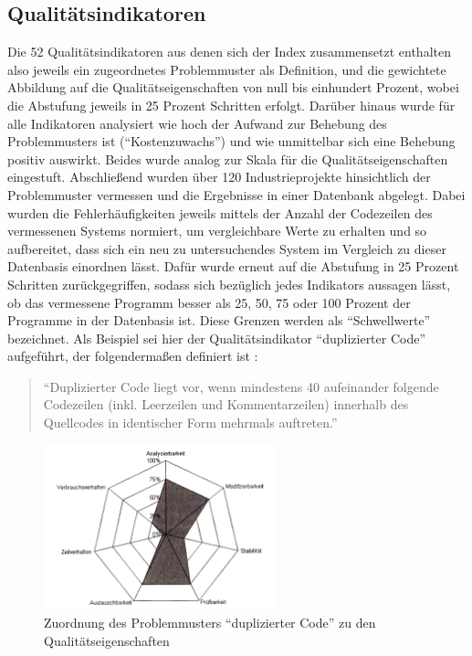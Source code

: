 \documentclass[da,ngerman]{stthesis}
\begin{document}
			\subsection{Qualitätsindikatoren}
				Die 52 Qualitätsindikatoren aus denen sich der Index zusammensetzt enthalten also jeweils ein zugeordnetes Problemmuster als Definition, und die gewichtete Abbildung auf die Qualitätseigenschaften von null bis einhundert Prozent, wobei die Abstufung jeweils in 25 Prozent Schritten erfolgt. Darüber hinaus wurde für alle Indikatoren analysiert wie hoch der Aufwand zur Behebung des Problemmusters ist ("`Kostenzuwachs"') und wie unmittelbar sich eine Behebung positiv auswirkt. Beides wurde analog zur Skala für die Qualitätseigenschaften eingestuft. Abschließend wurden über 120 Industrieprojekte hinsichtlich der Problemmuster vermessen und die Ergebnisse in einer Datenbank abgelegt. Dabei wurden die Fehlerhäufigkeiten jeweils mittels der Anzahl der Codezeilen des vermessenen Systems normiert, um vergleichbare Werte zu erhalten und so aufbereitet, dass sich ein neu zu untersuchendes System im Vergleich zu dieser Datenbasis einordnen lässt. Dafür wurde erneut auf die Abstufung in 25 Prozent Schritten zurückgegriffen, sodass sich bezüglich jedes Indikators aussagen lässt, ob das vermessene Programm besser als 25, 50, 75 oder 100 Prozent der Programme in der Datenbasis ist. Diese Grenzen werden als "`Schwellwerte"' bezeichnet. \newline
			Als Beispiel sei hier der Qualitätsindikator "`duplizierter Code"' aufgeführt, der folgendermaßen definiert ist \cite{CodeQualityManagement}:
				\begin{quote}
  					"`Duplizierter Code liegt vor, wenn mindestens 40 aufeinander folgende Codezeilen (inkl. Leerzeilen und Kommentarzeilen) innerhalb des Quellcodes in identischer Form mehrmals auftreten."'
  				\end{quote}
  				\begin{figure} [h]
					\centering
					\includegraphics [width=0.6\textwidth] {indexeigenschaften.png}
					\caption{Zuordnung des Problemmusters "`duplizierter Code"' zu den Qualitätseigenschaften \cite{CodeQualityManagement}}
					\label{indexeigen}
				\end{figure}
\end{document}
